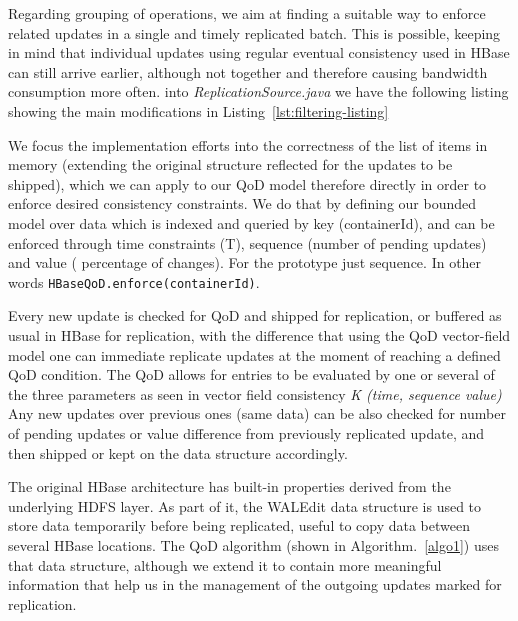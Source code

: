 
Regarding grouping of operations, we aim at finding a suitable way to enforce related updates in a single and timely replicated batch. This is possible, keeping in mind that individual updates using regular eventual consistency used in HBase can still arrive earlier, although not together and therefore causing bandwidth consumption more often.  into \emph{ReplicationSource.java} we have the following listing showing the main modifications in Listing~\ref{lst:filtering-listing}





We focus the implementation efforts into the correctness of the list of items in memory (extending the original structure reflected for the updates to be shipped), which we can apply to our QoD model therefore directly in order to enforce desired consistency constraints. We do that by defining our bounded model over data which is indexed and queried by key (containerId), and can be enforced through time constraints (T), sequence (number of pending updates) and value ( percentage of changes). For the prototype just sequence. In other words \texttt{HBaseQoD.enforce(containerId)}.

Every new update is checked for QoD and shipped for replication, or buffered as usual in HBase for replication, with the difference that using the QoD vector-field model one can immediate replicate updates at the moment of reaching a defined QoD condition. The QoD allows for entries to be evaluated by one or several of the three parameters as seen in vector field consistency \emph{K (time, sequence value)}~\cite{Santos:2007} Any new updates over previous ones (same data) can be also checked for number of pending updates or value difference from previously replicated update, and then shipped or kept on the data structure accordingly.

The original HBase architecture has built-in properties derived from the underlying HDFS layer. As part of it, the WALEdit data structure is used to store data temporarily before being replicated, useful to copy data between several HBase locations. The QoD algorithm (shown in Algorithm.~\ref{algo1}) uses that data structure, although we extend it to contain more meaningful information that help us in the management of the outgoing updates marked for replication.

